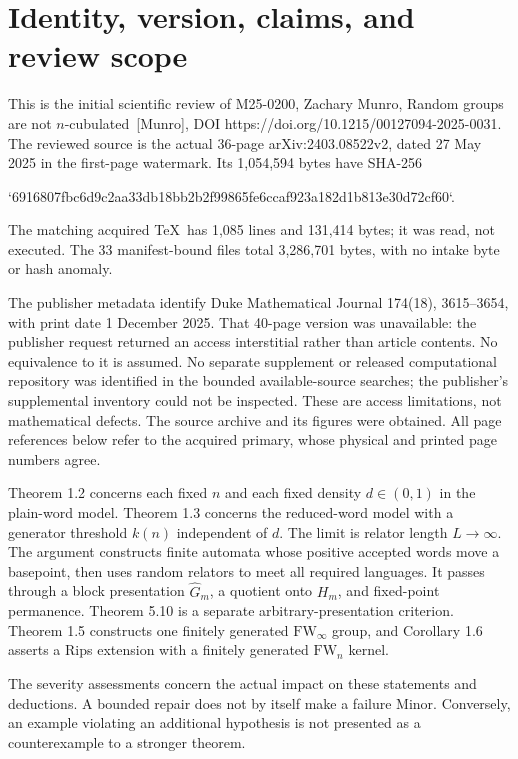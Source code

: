 \documentclass[10pt]{article}
\begin{document}
\section*{Identity, version, claims, and review scope}
This is the initial scientific review of M25-0200, Zachary Munro, Random groups are not \(n\)-cubulated [Munro], DOI https://doi.org/10.1215/00127094-2025-0031. The reviewed source is the actual 36-page arXiv:2403.08522v2, dated 27 May 2025 in the first-page watermark. Its 1,054,594 bytes have SHA-256\par
`6916807fbc6d9c2aa33db18bb2b2f99865fe6ccaf923a182d1b813e30d72cf60`.\par
The matching acquired TeX has 1,085 lines and 131,414 bytes; it was read, not executed. The 33 manifest-bound files total 3,286,701 bytes, with no intake byte or hash anomaly.\par
The publisher metadata identify Duke Mathematical Journal 174(18), 3615–3654, with print date 1 December 2025. That 40-page version was unavailable: the publisher request returned an access interstitial rather than article contents. No equivalence to it is assumed. No separate supplement or released computational repository was identified in the bounded available-source searches; the publisher’s supplemental inventory could not be inspected. These are access limitations, not mathematical defects. The source archive and its figures were obtained. All page references below refer to the acquired primary, whose physical and printed page numbers agree.\par
Theorem 1.2 concerns each fixed \(n\) and each fixed density \(d\in(0,1)\) in the plain-word model. Theorem 1.3 concerns the reduced-word model with a generator threshold \(k(n)\) independent of \(d\). The limit is relator length \(L\to\infty\). The argument constructs finite automata whose positive accepted words move a basepoint, then uses random relators to meet all required languages. It passes through a block presentation \(\widehat G_m\), a quotient onto \(H_m\), and fixed-point permanence. Theorem 5.10 is a separate arbitrary-presentation criterion. Theorem 1.5 constructs one finitely generated \(\mathrm{FW}_\infty\) group, and Corollary 1.6 asserts a Rips extension with a finitely generated \(\mathrm{FW}_n\) kernel.\par
The severity assessments concern the actual impact on these statements and deductions. A bounded repair does not by itself make a failure Minor. Conversely, an example violating an additional hypothesis is not presented as a counterexample to a stronger theorem.\par
\end{document}
